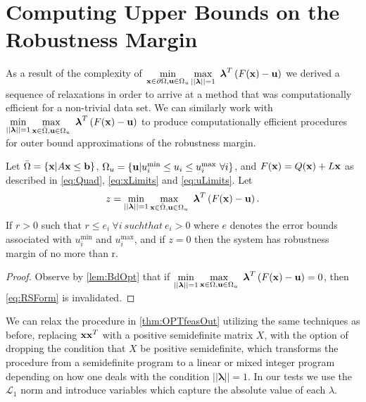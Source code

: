 \section{Computing Upper Bounds on the Robustness Margin} \label{sec:outbdform}  

As a result of the complexity of $\displaystyle \min\limits_{\vx\in \partial \Omega, \vu\in\Omega_u}\max\limits_{||\boldsymbol{\lambda}||=1 }\ \boldsymbol{\lambda}^T\left(F(\vx)-\vu\right)$ we derived a sequence of relaxations in order to arrive at a method that was computationally efficient for a non-trivial data set. 
We can similarly work with $\displaystyle \min\limits_{||\boldsymbol{\lambda}||=1}\max\limits_{\vx\in \bar{\Omega}, \vu\in\Omega_u}\ \boldsymbol{\lambda}^T\left(F(\vx)-\vu\right)$ to produce computationally efficient procedures for outer bound approximations of the robustness margin. 
\begin{thm}\label{thm:OPTfeasOut} 
Let $\bar{\Omega}=\{\mathbf{x}| A\mathbf{x}\leq \mathbf{b}\}$, $\Omega_{u}=\{\mathbf{u}| u^{\min}_i\leq u_i \leq u^{\max}_i \ \forall i \}$, and $F(\mathbf{x})=Q(\mathbf{x})+L\mathbf{x}$ as described in \cref{eq:Quad}, \cref{eq:xLimits} and \cref{eq:uLimits}. 
Let
$$z = \min\limits_{||\boldsymbol{\lambda}||=1}\max\limits_{\vx\in \bar{\Omega}, \vu\in\Omega_u}\ \boldsymbol{\lambda}^T\left(F(\vx)-\vu\right).$$
If $r>0$ such that $r\leq e_i \ \forall i \ such that \ e_i>0$ where $e$ denotes the error bounds associated with $ u^{\min}_i$ and $ u^{\max}_i$, and if $z=0$ then the system has robustness margin of no more than r.

\begin{proof} 
  Observe by \cref{lem:BdOpt} that if $\min\limits_{||\boldsymbol{\lambda}||=1}\max\limits_{\vx\in \Omega, \vu\in\Omega_u}\ \boldsymbol{\lambda}^T\left(F(\vx)-\vu\right)=0$, then \cref{eq:RSForm} is invalidated.  

\end{proof}
\end{thm}

We can relax the procedure in \cref{thm:OPTfeasOut} utilizing the same techniques as before, replacing $\mathbf{x}\mathbf{x}^T$ with a positive semidefinite matrix $X$, with the option of dropping the condition that $X$ be positive semidefinite, which transforms the procedure from a semidefinite program to a linear or mixed integer program depending on how one deals with the condition $||\boldsymbol{\lambda}||=1$. 
In our tests we use the $\mathcal{L}_1$ norm and introduce variables which capture the absolute value of each $\lambda$.

